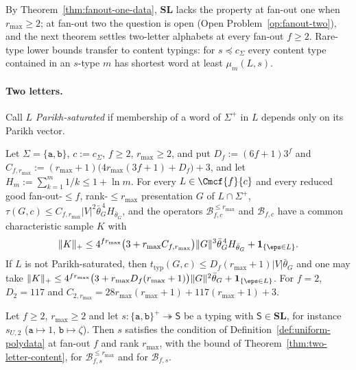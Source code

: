 By Theorem~\ref{thm:fanout-one-data}, $\mathbf{SL}$ lacks the property at
fan-out one when $r_{\max}\ge2$; at fan-out two the question is open (Open
Problem~\ref{op:fanout-two}), and the next theorem settles two-letter
alphabets at every fan-out $f\ge2$.  Rare-type lower bounds transfer to content
typings: for $s\preceq c_\Sigma$ every content type contained in an $s$-type $m$
has shortest word at least $\mu_m(L,s)$.

\paragraph{Two letters.}
Call $L$ \emph{Parikh-saturated} if membership of a word of $\Sigma^+$ in $L$
depends only on its Parikh vector.

\begin{theorem}
\label{thm:two-letter-content}
Let $\Sigma=\{\mathtt a,\mathtt b\}$, $c:=c_\Sigma$, $f\ge2$, $r_{\max}\ge2$, and put
$D_f:=(6f+1)3^f$ and
$C_{f,r_{\max}}:=(r_{\max}+1)\bigl(4r_{\max}(3f+1)+D_f\bigr)+3$, and let
$H_m:=\sum_{k=1}^m1/k\le1+\ln m$.  For every
$L\in\Cmcf{f}{c}$ and every reduced good fan-out-$\le f$, rank-$\le r_{\max}$
presentation $G$ of $L\cap\Sigma^+$,
$\tau(G,c)\le C_{f,r_{\max}}|V|^2\bar\theta_G^{\,4}H_{\bar\theta_G}$, and the operators
$\mathcal B^{\le r_{\max}}_{f,c}$ and $\mathcal B_{f,c}$ have a common
characteristic sample $K$ with
\[
 \|K\|_+\le4^{fr_{\max}}\bigl(3+r_{\max}C_{f,r_{\max}}\bigr)\|G\|^3\bar\theta_G^{\,4}H_{\bar\theta_G}
 +\mathbf 1_{\{\eps\in L\}}.
\]
If $L$ is not Parikh-saturated, then
$t_{\mathrm{typ}}(G,c)\le D_f(r_{\max}+1)|V|\bar\theta_G$ and one may take
$\|K\|_+\le4^{fr_{\max}}\bigl(3+r_{\max}D_f(r_{\max}+1)\bigr)\|G\|^2\bar\theta_G
+\mathbf 1_{\{\eps\in L\}}$.  For $f=2$, $D_2=117$ and
$C_{2,r_{\max}}=28r_{\max}(r_{\max}+1)+117(r_{\max}+1)+3$.
\end{theorem}

\begin{corollary}
\label{cor:two-letter-semilattice}
Let $f\ge2$, $r_{\max}\ge2$ and let $s:\{\mathtt a,\mathtt b\}^+\twoheadrightarrow\mathsf S$ be a
typing with $\mathsf S\in\mathbf{SL}$, for instance $s_{U,2}$
\textup($\mathtt a\mapsto1$, $\mathtt b\mapsto\zeta$\textup).  Then $s$ satisfies
the condition of Definition~\ref{def:uniform-polydata} at fan-out $f$ and rank
$r_{\max}$, with the bound of Theorem~\ref{thm:two-letter-content}, for
$\mathcal B^{\le r_{\max}}_{f,s}$ and for $\mathcal B_{f,s}$.
\end{corollary}

